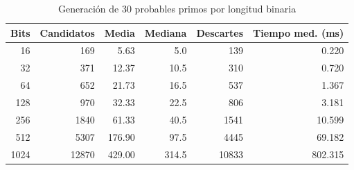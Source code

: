 \begin{table}[H]\centering\small
\caption{Generación de 30 probables primos por longitud binaria}
\label{tab:generacion}
\begin{tabular}{rrrrrr}\toprule
Bits & Candidatos & Media & Mediana & Descartes & Tiempo med. (ms) \\
\midrule
16 & 169 & 5.63 & 5.0 & 139 & 0.220 \\
32 & 371 & 12.37 & 10.5 & 310 & 0.720 \\
64 & 652 & 21.73 & 16.5 & 537 & 1.367 \\
128 & 970 & 32.33 & 22.5 & 806 & 3.181 \\
256 & 1840 & 61.33 & 40.5 & 1541 & 10.599 \\
512 & 5307 & 176.90 & 97.5 & 4445 & 69.182 \\
1024 & 12870 & 429.00 & 314.5 & 10833 & 802.315 \\
\bottomrule\end{tabular}\end{table}
